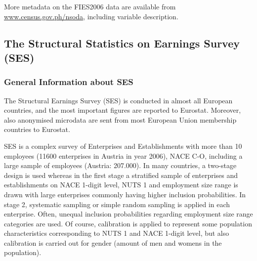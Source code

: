 \documentclass[12pt]{article}
\begin{document}
More metadata on the FIES2006 data are available from \href{www.census.gov.ph/nsoda}{www.census.gov.ph/nsoda}, including variable
description. 


\subsection{The Structural Statistics on Earnings Survey (SES)}\label{data:ses}


\subsubsection{General Information about SES}

The Structural Earnings Survey (SES) is conducted in almost all European
countries, and the most important figures are reported to Eurostat.
Moreover, also anonymised microdata are sent from most European Union membership countries to Eurostat. 


SES is a complex survey of Enterprises and Establishments with more than 10
employees (11600 enterprises in Austria in year 2006), NACE C-O, including a large
sample of employees (Austria: 207.000). 
In many countries, a two-stage design is used whereas
in the first stage a stratified sample of enterprises and establishments on NACE 1-digit level, 
NUTS 1 and employment size range is drawn with large enterprises commonly having higher inclusion probabilities. In stage 2, systematic sampling or simple
random sampling is applied in each enterprise. Often, unequal inclusion
probabilities regarding employment size range categories are used.
Of course, calibration is applied to represent some population
characteristics corresponding to NUTS 1 and NACE 1-digit level, but also 
calibration is carried out for gender (amount of men and womens in the
population).\\
\end{document}
